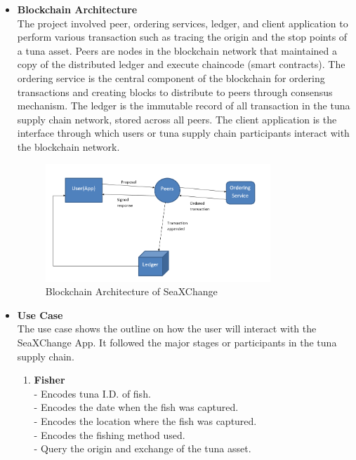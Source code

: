 	\begin{itemize}
		\item \textbf{Blockchain Architecture}
		\\The project involved peer, ordering services, ledger, and client application to perform various transaction such as tracing the origin and the stop points of a tuna asset. Peers are nodes in the blockchain network that maintained a copy of the distributed ledger and execute chaincode (smart contracts). The ordering service is the central component of the blockchain for ordering transactions and creating blocks to distribute to peers through consensus mechanism. The ledger is the immutable record of all transaction in the tuna supply chain network, stored across all peers. The client application is the interface through which users or tuna supply chain participants interact with the blockchain network.
		
		\begin{figure}[H]
			\centering
			\includegraphics[width=0.8\textwidth]{SeaXChange_model.png}
			\caption{Blockchain Architecture of SeaXChange}
			\label{fig:blockchain_model}
		\end{figure}
		
		
		
		\item \textbf{Use Case}
		\\The use case shows the outline on how the user will interact with the SeaXChange App. It followed the major stages or participants in the tuna supply chain. 
		\begin{enumerate}
			\item \textbf{Fisher}
			\\- Encodes tuna I.D. of fish.
			\\- Encodes the date when the fish was captured.
			\\- Encodes the location where the fish was captured.
			\\- Encodes the fishing method used.
			\\- Query the origin and exchange of the tuna asset.
			

\end{enumerate}
\end{itemize}
